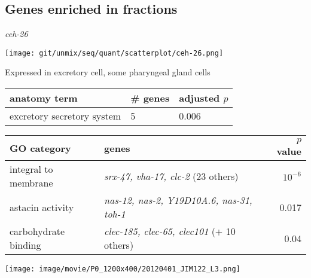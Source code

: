 \documentclass[serif,9pt]{beamer}
\begin{document}
\subsection{Genes enriched in fractions}

\begin{frame}{{\em ceh-26}}

\begin{minipage}{0.4\textwidth}
\texttt{[image: git/unmix/seq/quant/scatterplot/ceh-26.png]}
\end{minipage}
\begin{minipage}{0.58\textwidth}

{\small Expressed in excretory cell, some pharyngeal gland cells}

\begin{table}[!tbp]\scriptsize
\begin{tabular}{lll}
anatomy term & \# genes & adjusted $p$ \\
\hline
excretory secretory system & 5 & 0.006 \\
\end{tabular}
\end{table}
\end{minipage}

\begin{table}\footnotesize
\begin{tabular}{llr}
GO category & genes & $p$ value \\
\hline
integral to membrane & {\em srx-47, vha-17, clc-2} (23 others) & $10^{-6}$ \\
astacin activity & {\em nas-12, nas-2, Y19D10A.6, nas-31, toh-1} & 0.017 \\
carbohydrate binding & {\em clec-185, clec-65, clec101} (+ 10 others) & 0.04 \\
\end{tabular}
\end{table}

\texttt{[image: image/movie/P0\_1200x400/20120401\_JIM122\_L3.png]}

\end{frame}
\end{document}
